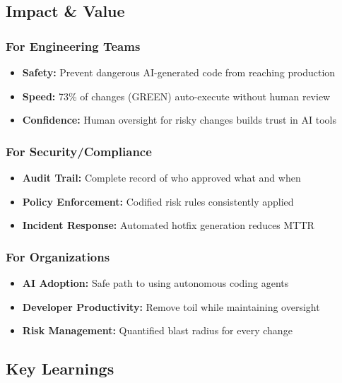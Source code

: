 \documentclass[11pt,a4paper]{article}
\begin{document}
\subsection{Impact \& Value}

\subsubsection{For Engineering Teams}
\begin{itemize}
    \item \textbf{Safety:} Prevent dangerous AI-generated code from reaching production
    \item \textbf{Speed:} 73\% of changes (GREEN) auto-execute without human review
    \item \textbf{Confidence:} Human oversight for risky changes builds trust in AI tools
\end{itemize}

\subsubsection{For Security/Compliance}
\begin{itemize}
    \item \textbf{Audit Trail:} Complete record of who approved what and when
    \item \textbf{Policy Enforcement:} Codified risk rules consistently applied
    \item \textbf{Incident Response:} Automated hotfix generation reduces MTTR
\end{itemize}

\subsubsection{For Organizations}
\begin{itemize}
    \item \textbf{AI Adoption:} Safe path to using autonomous coding agents
    \item \textbf{Developer Productivity:} Remove toil while maintaining oversight
    \item \textbf{Risk Management:} Quantified blast radius for every change
\end{itemize}

\subsection{Key Learnings}
\end{document}
